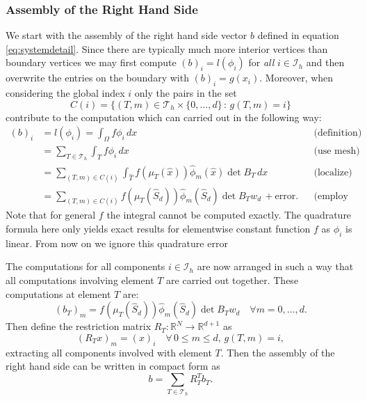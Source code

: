 \documentclass[a4paper,
		     11pt,
		     DIV12,
		     DIVcalc,
		     headings=normal,
		     oneside,
		     bibliography=totoc,
		     headsepline=false,
		     headinclude]{scrartcl}
\begin{document}
\subsubsection*{Assembly of the Right Hand Side}

We start with the assembly of the right hand side vector $b$
defined in equation \eqref{eq:systemdetail}. Since there are typically much more 
interior vertices than boundary vertices we may first compute $(b)_i = l(\phi_i)$
for {\em all} $i\in\mathcal{I}_h$ and then overwrite the entries on the boundary
with $(b)_i = g(x_i)$. Moreover, when considering the global index $i$
only the pairs in the set
$$C(i) = \{(T,m)\in\mathcal{T}_h\times\{0,\ldots,d\} \,:\, g(T,m)=i\}$$
contribute to the computation which can carried out in the following way:
\begin{align*}
(b)_i &= l(\phi_i) = \int_\Omega f \phi_i\,dx &&\text{(definition)} \\
&= \sum_{T\in\mathcal{T}_h} \int_T f \phi_i\,dx &&\text{(use mesh)} \\
&= \sum_{(T,m)\in C(i)} \int_{\hat T} f(\mu_T(\hat x)) \hat\phi_m(\hat x) \det B_T\,dx 
&&\text{(localize)} \\
&= \sum_{(T,m)\in C(i)} 
f(\mu_T(\hat S_d)) \hat\phi_m(\hat S_d) \det B_T w_d \, + \text{error}. &&\text{(employ quadrature)} 
\end{align*}
Note that for general $f$ the integral cannot be computed exactly. The
quadrature formula here only yields exact results for elementwise constant
function $f$ as $\phi_i$ is linear. From now on we ignore this quadrature error

The computations for all components $i\in\mathcal{I}_h$ are now arranged
in such a way that all computations involving element $T$ are carried out together.
These computations at element $T$ are:
\begin{equation*}
(b_T)_m =  f(\mu_T(\hat S_d)) \hat\phi_m(\hat S_d) \det B_T w_d \quad \forall m=0,\ldots,d .
\end{equation*}
Then define the restriction matrix 
$R_T : \mathbb{R}^N \to \mathbb{R}^{d+1}$ as
\begin{equation}
(R_T x)_m = (x)_i \quad \forall \,0\leq m \leq d, \,g(T,m)=i,
\end{equation}
extracting all components involved with element $T$. Then
the assembly of the right hand side can be written in compact form as
\begin{equation}
b = \sum_{T\in\mathcal{T}_h} R_T^T b_T .
\label{eq:rhsassembly}
\end{equation}
\end{document}
